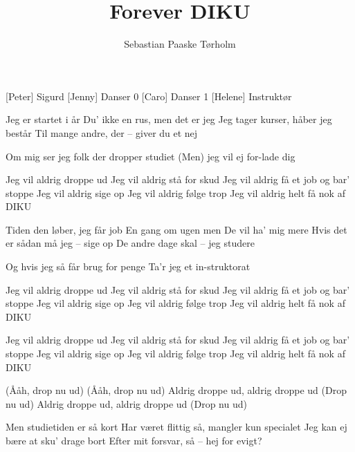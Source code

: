 \documentclass[a4paper,11pt]{article}
\title{Forever DIKU}
\author{Sebastian Paaske Tørholm}
\begin{document}
\maketitle

\begin{roles}
    [Peter] Sigurd 
    [Jenny] Danser 0
    [Caro] Danser 1
    [Helene] Instruktør
\end{roles}

\begin{song}
  
            Jeg er startet i år
            Du' ikke en rus, men det er jeg
            Jeg tager kurser, håber jeg består
            Til mange andre, der -- giver du et nej

            Om mig ser jeg folk der dropper studiet
            (Men) jeg vil ej for-lade dig

            Jeg vil aldrig droppe ud
            Jeg vil aldrig stå for skud
            Jeg vil aldrig få et job og bar' stoppe
            Jeg vil aldrig sige op
            Jeg vil aldrig følge trop
            Jeg vil aldrig helt få nok af DIKU

            Tiden den løber, jeg får job
            En gang om ugen men
            De vil ha' mig mere
            Hvis det er sådan må jeg -- sige op
            De andre dage skal -- jeg studere

            Og hvis jeg så får brug for penge
            Ta'r jeg et in-struktorat

            Jeg vil aldrig droppe ud
            Jeg vil aldrig stå for skud
            Jeg vil aldrig få et job og bar' stoppe
            Jeg vil aldrig sige op
            Jeg vil aldrig følge trop
            Jeg vil aldrig helt få nok af DIKU

            Jeg vil aldrig droppe ud
            Jeg vil aldrig stå for skud
            Jeg vil aldrig få et job og bar' stoppe
            Jeg vil aldrig sige op
            Jeg vil aldrig følge trop
            Jeg vil aldrig helt få nok af DIKU

            (Ååh, drop nu ud)
            (Ååh, drop nu ud)
            Aldrig droppe ud, aldrig droppe ud
            (Drop nu ud)
            Aldrig droppe ud, aldrig droppe ud
            (Drop nu ud)

            Men studietiden er så kort
            Har været flittig så,
            mangler kun specialet
            Jeg kan ej bære at sku' drage bort
            Efter mit forsvar, så -- hej for evigt?


\end{song}
\end{document}
